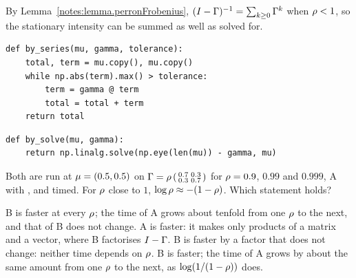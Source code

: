 \begin{question}
\label{question.stationaryIntensityBySeriesAgainstSolve}
By Lemma~\ref{notes:lemma.perronFrobenius},
$(I - \Gamma)^{-1} = \sum_{k \geq 0}\Gamma^{k}$ when $\rho < 1$,
so the stationary intensity can be summed as well as solved for.
\begin{lstlisting}[caption={Alternative A}, label=listing.stationaryIntensityBySeriesAgainstSolveA]
def by_series(mu, gamma, tolerance):
    total, term = mu.copy(), mu.copy()
    while np.abs(term).max() > tolerance:
        term = gamma @ term
        total = total + term
    return total
\end{lstlisting}
\begin{lstlisting}[caption={Alternative B}, label=listing.stationaryIntensityBySeriesAgainstSolveB]
def by_solve(mu, gamma):
    return np.linalg.solve(np.eye(len(mu)) - gamma, mu)
\end{lstlisting}
Both are run at $\mu = (0.5, 0.5)$ on
$\Gamma = \rho\left(\begin{smallmatrix} 0.7 & 0.3 \\ 0.3 & 0.7 \end{smallmatrix}\right)$
for $\rho = 0.9$, $0.99$ and $0.999$,
A with , and timed.
For $\rho$ close to $1$, $\log\rho \approx -(1 - \rho)$.
Which statement holds?
\begin{choices}
 \correctchoice B is faster at every $\rho$;
  the time of A grows about tenfold from one $\rho$ to the next,
  and that of B does not change.
 \choice A is faster: it makes only products of a matrix and a vector,
  where B factorises $I - \Gamma$.
 \choice B is faster by a factor that does not change:
  neither time depends on $\rho$.
 \choice B is faster;
  the time of A grows by about the same amount from one $\rho$ to the next,
  as $\log(1/(1 - \rho))$ does.
\end{choices}
\end{question}
